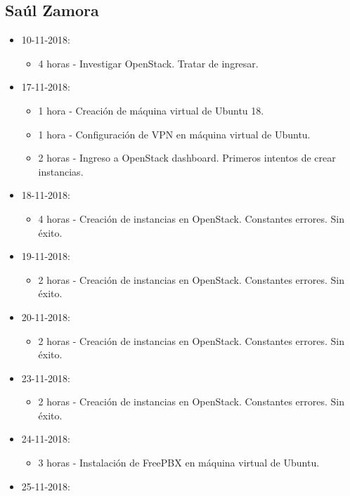 \documentclass{article}
\begin{document}
\subsection{Sa\'ul Zamora}
\begin{itemize}
  \item 10-11-2018:
  \begin{itemize}
    \item 4 horas - Investigar OpenStack. Tratar de ingresar.
  \end{itemize}
  \item 17-11-2018:
  \begin{itemize}
    \item 1 hora - Creaci\'on de m\'aquina virtual de Ubuntu 18.
    \item 1 hora - Configuraci\'on de VPN en m\'aquina virtual de Ubuntu.
    \item 2 horas - Ingreso a OpenStack dashboard. Primeros intentos de crear instancias.
  \end{itemize}
  \item 18-11-2018:
  \begin{itemize}
    \item 4 horas - Creaci\'on de instancias en OpenStack. Constantes errores. Sin \'exito.
  \end{itemize}
  \item 19-11-2018:
  \begin{itemize}
    \item 2 horas - Creaci\'on de instancias en OpenStack. Constantes errores. Sin \'exito.
  \end{itemize}
  \item 20-11-2018:
  \begin{itemize}
    \item 2 horas - Creaci\'on de instancias en OpenStack. Constantes errores. Sin \'exito.
  \end{itemize}
  \item 23-11-2018:
  \begin{itemize}
    \item 2 horas - Creaci\'on de instancias en OpenStack. Constantes errores. Sin \'exito.
  \end{itemize}
  \item 24-11-2018:
  \begin{itemize}
    \item 3 horas - Instalaci\'on de FreePBX en m\'aquina virtual de Ubuntu.
  \end{itemize}
  \item 25-11-2018:

\end{itemize}
\end{document}
